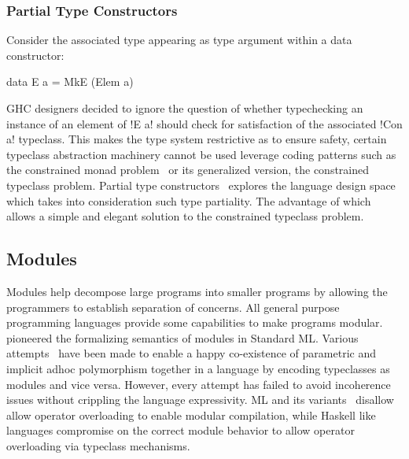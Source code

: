 \documentclass[screen,nonacm,manuscript,review]{acmart} %
\begin{document}
\subsubsection{Partial Type Constructors}
Consider the associated type appearing as type argument within a data
constructor:

\begin{CenteredBox}
\begin{code}
data E a = MkE (Elem a)
\end{code}
\end{CenteredBox}

GHC designers decided to ignore the question of whether typechecking
an instance of an element of !E a! should check for satisfaction of
the associated !Con a! typeclass. This makes the type system restrictive as to
ensure safety, certain typeclass abstraction machinery cannot be used
leverage coding patterns such as the constrained monad
problem~\cite{sculthorpe_constrained-monad_2013} or its generalized
version, the constrained typeclass problem. Partial type
constructors~\cite{jones_partial_2019,ingle_partial_2022} explores the language design
space which takes into consideration such type partiality. The
advantage of which allows a simple and elegant solution to the
constrained typeclass problem.

\subsection{Modules}\label{sec:rw-modules}
Modules help decompose large programs into smaller programs by allowing the programmers to establish separation of concerns. All general purpose programming languages provide some capabilities to make programs modular. ~\citet{macqueen_modules_1984} pioneered the formalizing semantics of modules in Standard ML.
Various attempts~\cite{dreyer_modular_2007, wehr_ml_2008, white_modular_2014} have been made to enable a happy co-existence of parametric and implicit adhoc polymorphism together in a language by encoding typeclasses as modules and vice versa. However, every attempt has failed to avoid incoherence issues without crippling the language expressivity. ML and its variants~\cite{milner_definition_1997,leroy_ocaml_2023} disallow allow operator overloading to enable modular compilation, while Haskell like languages compromise on the correct module behavior to allow operator overloading via typeclass mechanisms.
\end{document}
